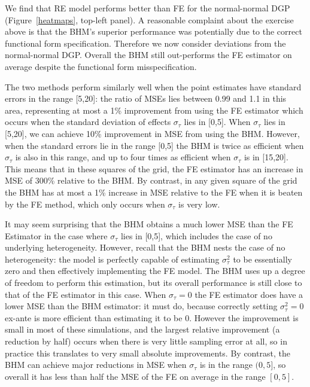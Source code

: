 \documentclass[12pt]{article}
\begin{document}
We find that RE model performs better than FE for the normal-normal DGP (Figure~\ref{heatmaps}, top-left panel). A reasonable complaint about the exercise above is that the BHM's superior performance was potentially due to the correct functional form specification. Therefore we now consider deviations from the normal-normal DGP. Overall the BHM still out-performs the FE estimator on average despite the functional form misspecification.

The two methods perform similarly well when the point estimates have standard errors in the range [5,20]: the ratio of MSEs lies between 0.99 and 1.1 in this area, representing at most a 1\% improvement from using the FE estimator which occurs when the standard deviation of effects $\sigma_{\tau}$ lies in [0,5]. When $\sigma_{\tau}$ lies in [5,20], we can achieve 10\% improvement in MSE from using the BHM. However, when the standard errors lie in the range [0,5] the BHM is twice as efficient when $\sigma_{\tau}$ is also in this range, and up to four times as efficient when $\sigma_{\tau}$ is in [15,20]. This means that in these squares of the grid, the FE estimator has an increase in MSE of 300\% relative to the BHM. By contrast, in any given square of the grid the BHM has at most a 1\% increase in MSE relative to the FE when it is beaten by the FE method, which only occurs when $\sigma_{\tau}$ is very low.

It may seem surprising that the BHM obtains a much lower MSE than the FE Estimator in the case where $\sigma_{\tau}$ lies in [0,5], which includes the case of no underlying heterogeneity. However, recall that the BHM nests the case of no heterogeneity: the model is perfectly capable of estimating $\sigma^2_{\tau}$ to be essentially zero and then effectively implementing the FE model. The BHM uses up a degree of freedom to perform this estimation, but its overall performance is still close to that of the FE estimator in this case. 
When $\sigma_{\tau} = 0$ the FE estimator does have a lower MSE than the BHM estimator: it must do, because correctly setting $\sigma^2_{\tau} = 0$ ex-ante is more efficient than estimating it to be 0. However the improvement is small in most of these simulations, and the largest relative improvement (a reduction by half) occurs when there is very little sampling error at all, so in practice this translates to very small absolute improvements. By contrast, the BHM can achieve major reductions in MSE when $\sigma_{\tau}$ is in the range $(0,5]$, so overall it has less than half the MSE of the FE on average in the range $[0,5]$.
\end{document}
